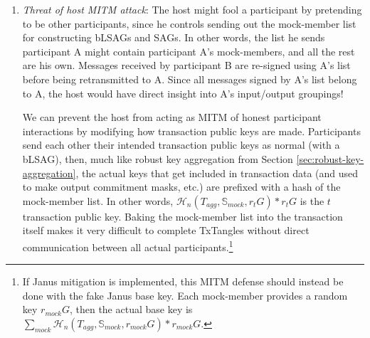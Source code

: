 \begin{enumerate}
    \item {\em Threat of host MITM attack}: The host might fool a participant by pretending to be other participants, since he controls sending out the mock-member list for constructing bLSAGs and SAGs. In other words, the list he sends participant A might contain participant A's mock-members, and all the rest are his own. Messages received by participant B are re-signed using A's list before being retransmitted to A. Since all messages signed by A's list belong to A, the host would have direct insight into A's input/output groupings!

    We can prevent the host from acting as MITM of honest participant interactions by modifying how transaction public keys are made. Participants send each other their intended transaction public keys as normal (with a bLSAG), then, much like robust key aggregation from Section \ref{sec:robust-key-aggregation}, the actual keys that get included in transaction data (and used to make output commitment masks, etc.) are prefixed with a hash of the mock-member list. In other words, $\mathcal{H}_n(T_{agg},\mathbb{S}_{mock},r_t G)*r_t G$ is the $t$\nth transaction public key. Baking the mock-member list into the transaction itself makes it very difficult to complete TxTangles without direct communication between all actual participants.\footnote{If Janus mitigation is implemented, this MITM defense should instead be done with the fake Janus base key. Each mock-member provides a random key $r_{mock} G$, then the actual base key is $\sum_{mock} \mathcal{H}_n(T_{agg},\mathbb{S}_{mock},r_{mock} G)*r_{mock} G$.}%
\end{enumerate}
